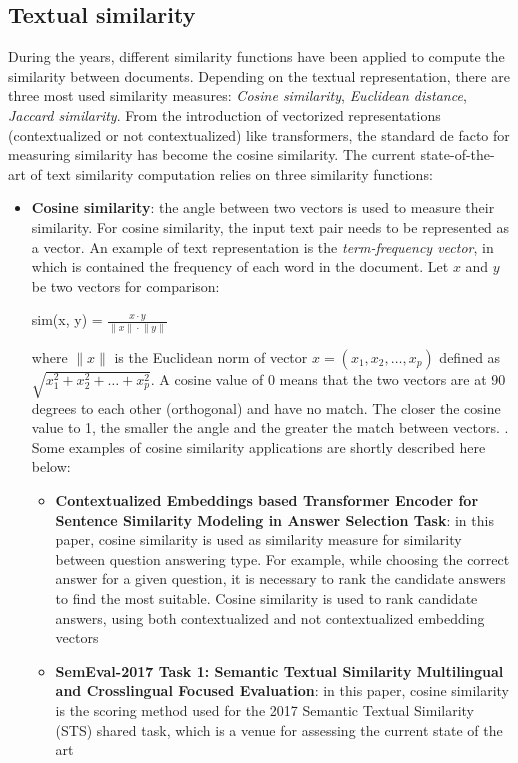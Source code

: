 \documentclass[\main/main.tex]{subfiles}
\begin{document}
\subsection{Textual similarity}
During the years, different similarity functions have been applied to compute the similarity between documents. Depending on the textual representation, there are three most used similarity measures: \emph{Cosine similarity}, \emph{Euclidean distance}, \emph{Jaccard similarity}. From the introduction of vectorized representations (contextualized or not contextualized) like transformers, the standard de facto for measuring similarity has become the cosine similarity.
The current state-of-the-art of text similarity computation relies on three similarity functions:
\begin{itemize}
    \item \textbf{Cosine similarity}: the angle between two vectors is used to measure their similarity. For cosine similarity, the input text pair needs to be represented as a vector. An example of text representation is the \emph{term-frequency vector}, in which is contained the frequency of each word in the document. Let $x$ and $y$ be two vectors for comparison:
    \begin{center}
        sim(x, y) = $\frac{x \cdot y}{\lVert x \rVert \cdot \lVert y \rVert}$
    \end{center}
    where $\lVert x \rVert$ is the Euclidean norm of vector $x = (x_1, x_2,\dots, x_p)$ defined as \\$\sqrt{x^2_1 + x^2_2 + \dots + x^2_p}$. A cosine value of 0 means that the two vectors are at 90 degrees to each other (orthogonal) and have no match. The closer the cosine value to 1, the smaller the angle and the greater the match between vectors. \cite{cosine_HAN201239} \cite{Gomaa2013ASO}. Some examples of cosine similarity applications are shortly described here below:
    \begin{itemize}
        \item \textbf{Contextualized Embeddings based Transformer Encoder for Sentence Similarity Modeling in Answer Selection Task}: in this paper, cosine similarity is used as similarity measure for similarity between question answering type. For example, while choosing the correct answer for a given question, it is necessary to rank the candidate answers to find the most suitable. Cosine similarity is used to rank candidate answers, using both contextualized and not contextualized embedding vectors \cite{Laskar2020ContextualizedEB} 
        \item \textbf{SemEval-2017 Task 1: Semantic Textual Similarity Multilingual and Crosslingual Focused Evaluation}: in this paper, cosine similarity is the scoring method used for the 2017 Semantic Textual Similarity (STS) shared task, which is a venue for assessing the current state of the art \cite{Cer2017SemEval2017T1}

\end{itemize}
\end{itemize}
\end{document}

